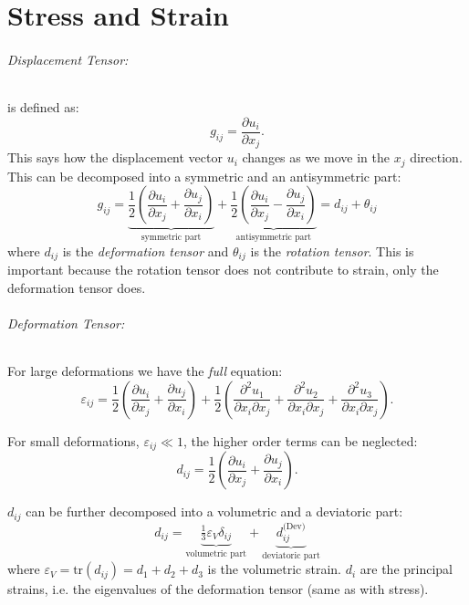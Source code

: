 \part{Stress and Strain}

\paragraph{Displacement Tensor:} is defined as:
\begin{equation}
	g_{ij} = \frac{\partial u_i}{\partial x_j}.
\end{equation}
This says how the displacement vector $u_i$ changes as we move in the $x_j$ direction.
This can be decomposed into a symmetric and an antisymmetric part:
\begin{equation}
	g_{ij} = \underbrace{\frac12 \left(\frac{\partial u_i}{\partial x_j} + \frac{\partial u_j}{\partial x_i}\right)}_{\text{symmetric part}} +
	\underbrace{\frac12 \left(\frac{\partial u_i}{\partial x_j} - \frac{\partial u_j}{\partial x_i}\right)}_{\text{antisymmetric part}}
	= d_{ij} + \theta_{ij}
\end{equation}
where $d_{ij}$ is the \textit{deformation tensor} and $\theta_{ij}$ is the \textit{rotation tensor}.
This is important because the rotation tensor does not contribute to strain, only the deformation tensor does.

\paragraph{Deformation Tensor:}
For large deformations we have the \textit{full} equation:
\begin{equation}
	\varepsilon_{ij} = 
	\frac12 \left(\frac{\partial u_i}{\partial x_j} + \frac{\partial u_j}{\partial x_i}\right) +
	\frac12 \left(\frac{\partial^2 u_1}{\partial x_i \partial x_j} +
	\frac{\partial^2 u_2}{\partial x_i \partial x_j} +
	\frac{\partial^2 u_3}{\partial x_i \partial x_j} \right).
\end{equation}

For small deformations, $\varepsilon_{ij} \ll 1$, the higher order terms can be neglected:
\begin{equation}
	d_{ij} = \frac12 \left(\frac{\partial u_i}{\partial x_j} + \frac{\partial u_j}{\partial x_i}\right) .
\end{equation}

$d_{ij}$ can be further decomposed into a volumetric and a deviatoric part:
\begin{equation}
	d_{ij} = \underbrace{\tfrac13 \varepsilon_{V} \delta_{ij}}_{\text{volumetric part}} +
	\underbrace{d_{ij}^{\text{(Dev)}}}_{\text{deviatoric part}}
\end{equation}
where $\varepsilon_V = \text{tr}(d_{ij}) = d_1 + d_2 + d_3$ is the volumetric strain.
$d_{i}$ are the principal strains, i.e. the eigenvalues of the deformation tensor (same as with stress).


